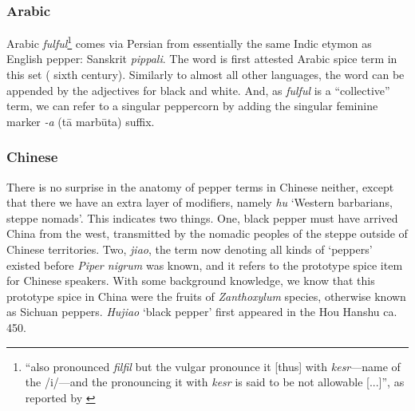 

\subsubsection{Arabic}



Arabic \textit{fulful}\footnote{``also pronounced \textit{filfil} but the vulgar pronounce it [thus] with \textit{kesr}---name of the /i/---and the pronouncing it with \textit{kesr} is said to be not allowable [...]'', as reported by \textcite[2434]{lane_arabic-english_1863}} comes via Persian from essentially the same Indic etymon as English pepper: Sanskrit \textit{pippali}. The word is first attested Arabic spice term in this set (\AD{} sixth century). Similarly to almost all other languages, the word can be appended by the adjectives for black and white. And, as \textit{fulful} is a ``collective'' term, we can refer to a singular peppercorn by adding the singular feminine marker \textit{-a} (t\={a} marb\={u}ta) suffix.







\subsubsection{Chinese}



There is no surprise in the anatomy of pepper terms in Chinese neither, except that there we have an extra layer of modifiers, namely \textit{hu} `Western barbarians, steppe nomads'. This indicates two things. One, black pepper must have arrived China from the west, transmitted by the nomadic peoples of the steppe outside of Chinese territories. Two, \textit{jiao}, the term now denoting all kinds of `peppers' existed before \textit{Piper nigrum} was known, and it refers to the prototype spice item for Chinese speakers. With some background knowledge, we know that this prototype spice in China were the fruits of \textit{Zanthoxylum} species, otherwise known as Sichuan peppers. \textit{Hujiao} `black pepper' first appeared in the \gls{Hou Hanshu} ca. \AD{} 450.






